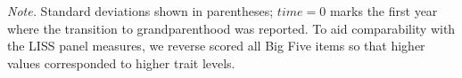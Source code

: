 \documentclass[
  english,
  man, noextraspace,floatsintext]{apa7}
\newenvironment{lltable}{\begin{landscape}\begin{center}\begin{ThreePartTable}}{\end{ThreePartTable}\end{center}\end{landscape}}
\begin{document}
\begin{appendix}
\begin{lltable}
{}

\end{lltable}










\begin{lltable}

\begin{TableNotes}[para]
\normalsize{\textit{Note.} Standard deviations shown in parentheses;
\(time=0\) marks the first year where the transition to grandparenthood
was reported. To aid comparability with the LISS panel measures, we
reverse scored all Big Five items so that higher values corresponded to
higher trait levels.}
\end{TableNotes}

\small{

}
\end{lltable}
\end{appendix}
\end{document}
